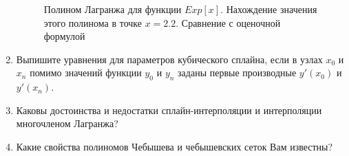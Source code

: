 \documentclass[12pt, a4paper]{article}
\begin{document}
\begin{enumerate}
\begin{figure}[H]
    \caption{Полином Лагранжа для функции $Exp[x]$. Нахождение значения этого полинома в точке $ x = 2.2 $. Сравнение с оценочной формулой}
    \label{fig:misclosure}
\end{figure}

\pagebreak

\item Выпишите уравнения для параметров кубического сплайна, если в узлах $x_0$ и $x_n$ помимо значений функции $y_0$ и $y_n$ заданы первые производные $y'(x_0)$ и $y'(x_n)$.

\item Каковы достоинства и недостатки сплайн-интерполяции и интерполяции многочленом Лагранжа?

\item Какие свойства полиномов Чебышева и чебышевских сеток Вам известны?


\end{enumerate}
\newpage
\end{document}
